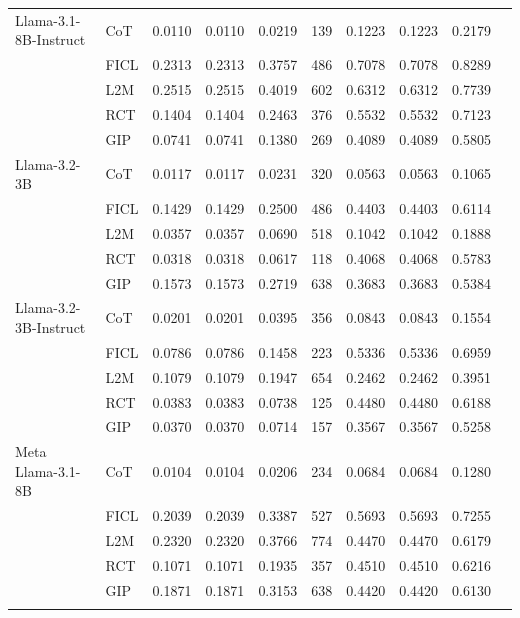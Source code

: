 \documentclass[conference]{IEEEtran}
\begin{document}
\begin{longtable}{p{3.5cm} l r r r r r r r r}
Llama-3.1-8B-Instruct & CoT  & 0.0110 & 0.0110 & 0.0219 & 139 & 0.1223 & 0.1223 & 0.2179 \\
                      & FICL & 0.2313 & 0.2313 & 0.3757 & 486 & 0.7078 & 0.7078 & 0.8289 \\
                      & L2M  & 0.2515 & 0.2515 & 0.4019 & 602 & 0.6312 & 0.6312 & 0.7739 \\
                      & RCT  & 0.1404 & 0.1404 & 0.2463 & 376 & 0.5532 & 0.5532 & 0.7123 \\
                      & GIP  & 0.0741 & 0.0741 & 0.1380 & 269 & 0.4089 & 0.4089 & 0.5805 \\ \addlinespace
Llama-3.2-3B & CoT  & 0.0117 & 0.0117 & 0.0231 & 320 & 0.0563 & 0.0563 & 0.1065 \\
             & FICL & 0.1429 & 0.1429 & 0.2500 & 486 & 0.4403 & 0.4403 & 0.6114 \\
             & L2M  & 0.0357 & 0.0357 & 0.0690 & 518 & 0.1042 & 0.1042 & 0.1888 \\
             & RCT  & 0.0318 & 0.0318 & 0.0617 & 118 & 0.4068 & 0.4068 & 0.5783 \\
             & GIP  & 0.1573 & 0.1573 & 0.2719 & 638 & 0.3683 & 0.3683 & 0.5384 \\ \addlinespace
Llama-3.2-3B-Instruct & CoT  & 0.0201 & 0.0201 & 0.0395 & 356 & 0.0843 & 0.0843 & 0.1554 \\
                      & FICL & 0.0786 & 0.0786 & 0.1458 & 223 & 0.5336 & 0.5336 & 0.6959 \\
                      & L2M  & 0.1079 & 0.1079 & 0.1947 & 654 & 0.2462 & 0.2462 & 0.3951 \\
                      & RCT  & 0.0383 & 0.0383 & 0.0738 & 125 & 0.4480 & 0.4480 & 0.6188 \\
                      & GIP  & 0.0370 & 0.0370 & 0.0714 & 157 & 0.3567 & 0.3567 & 0.5258 \\ \addlinespace
Meta Llama-3.1-8B & CoT  & 0.0104 & 0.0104 & 0.0206 & 234 & 0.0684 & 0.0684 & 0.1280 \\
                  & FICL & 0.2039 & 0.2039 & 0.3387 & 527 & 0.5693 & 0.5693 & 0.7255 \\
                  & L2M  & 0.2320 & 0.2320 & 0.3766 & 774 & 0.4470 & 0.4470 & 0.6179 \\
                  & RCT  & 0.1071 & 0.1071 & 0.1935 & 357 & 0.4510 & 0.4510 & 0.6216 \\
                  & GIP  & 0.1871 & 0.1871 & 0.3153 & 638 & 0.4420 & 0.4420 & 0.6130 \\ \addlinespace

\end{longtable}
\end{document}
